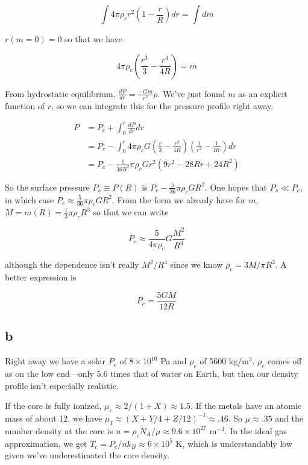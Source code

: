 \documentclass[12pt]{article}
\begin{document}
\[ \int 4\pi \rho_c r^2\left(1-\frac{r}{R}\right)dr = \int dm
\]

\(r(m=0) = 0\) so that we have

\[ 4\pi \rho_c \left( \frac{r^3}{3} - \frac{r^4}{4R} \right) = m
\]

From hydrostatic equilibrium, \(\frac{dP}{dr} = \frac{-Gm}{r^2}\rho\). We've just found \(m\) as an explicit function of \(r\), so we can integrate this for the pressure profile right away.

\begin{align*}
P &= P_c + \int_0^r \frac{dP}{dr}dr \\[12pt]
&= P_c - \int_0^r 4\pi\rho_c G \left(  \frac{r}{3} - \frac{r^2}{4R} \right)\left( \frac{1}{r^2} - \frac{1}{Rr} \right)dr \\[12pt]
&= P_c - \frac{1}{36R^2} \pi\rho_c G r^2\left( 9r^2 -28Rr + 24R^2 \right)
\end{align*}

So the surface pressure \( P_s \equiv P(R)\) is \(P_c - \frac{5}{36}\pi\rho_c G R^2\). One hopes that \(P_s \ll P_c\), in which case \(P_c \approx \frac{5}{36}\pi\rho_cG R^2\). From the form we already have for \(m\), \(M = m(R) = \frac{1}{3}\pi\rho_c R^3 \) so that we can write

\[ P_c \approx \frac{5}{4\pi\rho_c}G\frac{M^2}{R^4}
\]

although the dependence isn't really \(M^2/R^4\) since we know \(\rho_c = 3M/\pi R^3\). A better expression is

\[ P_c = \frac{5GM}{12R}\]

\subsection*{b}

Right away we have a solar \(P_c\) of \(8\times 10^{10}\) Pa and \(\rho_c\) of 5600 kg/m\(^3\). \(\rho_c\) comes off as on the low end---only 5.6 times that of water on Earth, but then our density profile isn't especially realistic.

If the core is fully ionized, \(\mu_e \approx 2/(1+X) \approx 1.5\). If the metals have an atomic mass of about 12, we have \(\mu_I \approx ( X + Y/4 + Z/12 )^{-1} \approx .46\). So  \(\mu \approx .35\) and the number density at the core is \(n = \rho_c N_{A}/\mu \approx 9.6 \times 10^{27}\) m\(^{-3}\). In the ideal gas approximation, we get \(T_c = P_c/nk_B \approx 6 \times 10^5\) K, which is understandably low given we've underestimated the core density.
\end{document}
